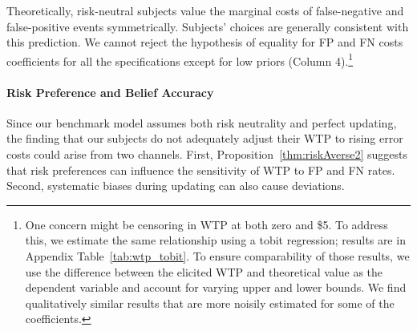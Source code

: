 \documentclass[12pt,a4paper]{article}
\newcommand{\agt}[1]{{\color{OliveGreen}#1}}
\newcommand{\aut}[1]{{\color{Red}#1}}
\begin{document}
Theoretically, risk-neutral subjects value the marginal costs of false-negative and false-positive events symmetrically. Subjects' choices are generally consistent with this prediction. We cannot reject the hypothesis of equality for FP and FN costs coefficients for all the specifications except for low priors (Column 4).\footnote{One concern might be censoring in WTP at both zero and \$5. To address this, we estimate the same relationship using a tobit regression; results are in Appendix Table~\ref{tab:wtp_tobit}. To ensure comparability of those results, we use the difference between the elicited WTP and theoretical value as the dependent variable and account for varying upper and lower bounds. We find qualitatively similar results that are more noisily estimated for some of the coefficients.}

 



\paragraph{Risk Preference and Belief Accuracy}
Since our benchmark model assumes both risk neutrality and perfect updating, the finding that our subjects do not adequately adjust their WTP to rising error costs  could arise from two channels. First, Proposition~\ref{thm:riskAverse2} suggests that risk preferences can influence the sensitivity of WTP to FP and FN rates. Second, systematic biases during updating can also cause deviations. 
\end{document}
